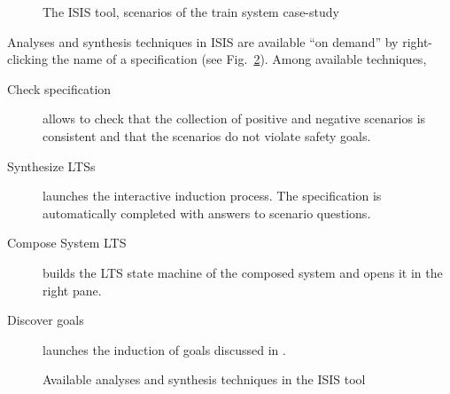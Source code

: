 \begin{figure}
\centering{}
  \caption{The ISIS tool, scenarios of the train system case-study\label{image:isis-tool}}
\end{figure}

Analyses and synthesis techniques in ISIS are available ``on demand'' by right-clicking the name of a specification (see Fig.~\ref{image:isis-tool-context}). Among available techniques,

\begin{description}
\item[Check specification] allows to check that the collection of positive and negative scenarios is consistent and that the scenarios do not violate safety goals.
\item[Synthesize LTSs] launches the interactive induction process. The specification is automatically completed with answers to scenario questions.
\item[Compose System LTS] builds the LTS state machine of the composed system and opens it in the right pane.
\item[Discover goals] launches the induction of goals discussed in \cite{Damas:2011}.
\end{description}

\begin{figure}
\centering{}
  \caption{Available analyses and synthesis techniques in the ISIS tool\label{image:isis-tool-context}}
\end{figure}

